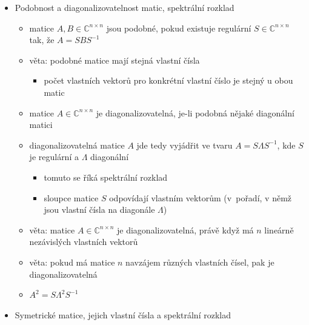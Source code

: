 \begin{itemize}
\begin{itemize}
\begin{itemize}
\end{itemize}
\item algebraická násobnost $\lambda$ je rovna násobnosti $\lambda$ jakožto kořene $p_A$
\item geometrická násobnost $\lambda$ je rovna $n-\mathrm{rank}(A-\lambda I_n)$, tj. počtu lineárně nezávislých vlastních vektorů, které odpovídají $\lambda$
\item algebraická násobnost $\geq$ geometrická násobnost
\begin{itemize}
\item obvykle se násobností myslí ta algebraická
\end{itemize}
\end{itemize}
\item Podobnost a diagonalizovatelnost matic, spektrální rozklad
\begin{itemize}
\item matice $A,B\in\mathbb C^{n\times n}$ jsou podobné, pokud existuje regulární $S\in\mathbb C^{n\times n}$ tak, že $A=SBS^{-1}$
\item věta: podobné matice mají stejná vlastní čísla
\begin{itemize}
\item počet vlastních vektorů pro konkrétní vlastní číslo je stejný u obou matic
\end{itemize}
\item matice $A\in\mathbb C^{n\times n}$ je diagonalizovatelná, je-li podobná nějaké diagonální matici
\item diagonalizovatelná matice $A$ jde tedy vyjádřit ve tvaru $A=S\Lambda S^{-1}$, kde $S$ je regulární a $\Lambda$ diagonální
\begin{itemize}
\item tomuto se říká spektrální rozklad
\item sloupce matice $S$ odpovídají vlastním vektorům (v~pořadí, v němž jsou vlastní čísla na diagonále $\Lambda$)
\end{itemize}
\item věta: matice $A\in\mathbb C^{n\times n}$ je diagonalizovatelná, právě když má $n$ lineárně nezávislých vlastních vektorů
\item věta: pokud má matice $n$ navzájem různých vlastních čísel, pak je diagonalizovatelná
\item $A^2=S\Lambda^2 S^{-1}$
\end{itemize}
\item Symetrické matice, jejich vlastní čísla a spektrální rozklad
\begin{itemize}

\end{itemize}
\end{itemize}
